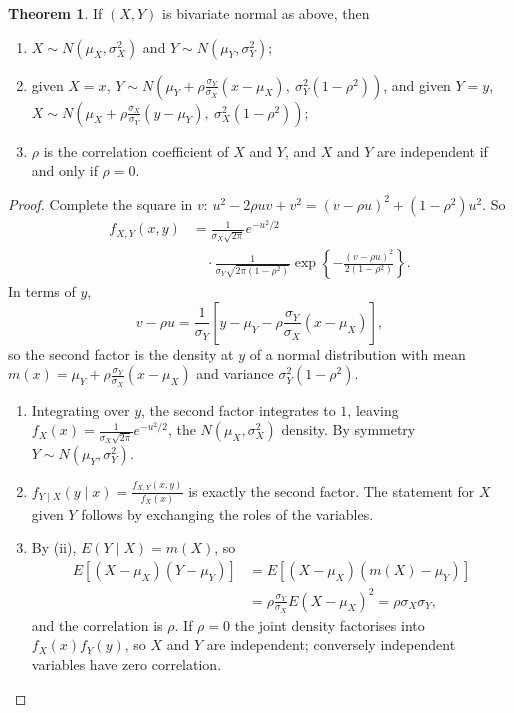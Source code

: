 \documentclass[12pt,a4paper]{report}
\theoremstyle{definition}
\newtheorem{thm}{Theorem}[section]
\theoremstyle{plain}
\theoremstyle{definition}
\begin{document}
\begin{thm}
\label{thm:bivariatenormal}
If $(X, Y)$ is bivariate normal as above, then
\begin{enumerate}
\item[(i)] $X\sim N(\mu_X, \sigma_X^2)$ and $Y\sim N(\mu_Y, \sigma_Y^2)$;
\item[(ii)] given $X = x$, $Y\sim N\left(\mu_Y + \rho\frac{\sigma_Y}{\sigma_X}(x - \mu_X),\ \sigma_Y^2(1 - \rho^2)\right)$, and
given $Y = y$, $X\sim N\left(\mu_X + \rho\frac{\sigma_X}{\sigma_Y}(y - \mu_Y),\ \sigma_X^2(1 - \rho^2)\right)$;
\item[(iii)] $\rho$ is the correlation coefficient of $X$ and $Y$, and $X$ and $Y$ are independent
if and only if $\rho = 0$.
\end{enumerate}
\end{thm}

\begin{proof}
Complete the square in $v$: $u^2 - 2\rho uv + v^2 = (v - \rho u)^2 + (1 - \rho^2)u^2$. So
\begin{align*}
f_{X,Y}(x,y) &= \frac{1}{\sigma_X\sqrt{2\pi}}e^{-u^2/2}\\
&\quad\cdot\frac{1}{\sigma_Y\sqrt{2\pi(1 - \rho^2)}}\exp\left\{-\frac{(v - \rho u)^2}{2(1 - \rho^2)}\right\}.
\end{align*}
In terms of $y$,
\[v - \rho u = \frac{1}{\sigma_Y}\left[y - \mu_Y - \rho\frac{\sigma_Y}{\sigma_X}(x - \mu_X)\right],\]
so the
second factor is the density at $y$ of a normal distribution with mean
$m(x) = \mu_Y + \rho\frac{\sigma_Y}{\sigma_X}(x - \mu_X)$ and variance $\sigma_Y^2(1 - \rho^2)$.
\begin{enumerate}
\item[(i)] Integrating over $y$, the second factor integrates to $1$, leaving
$f_X(x) = \frac{1}{\sigma_X\sqrt{2\pi}}e^{-u^2/2}$, the $N(\mu_X, \sigma_X^2)$ density. By symmetry
$Y\sim N(\mu_Y, \sigma_Y^2)$.
\item[(ii)] $f_{Y\mid X}(y\mid x) = \frac{f_{X,Y}(x,y)}{f_X(x)}$ is exactly the second factor. The
statement for $X$ given $Y$ follows by exchanging the roles of the variables.
\item[(iii)] By (ii), $E(Y\mid X) = m(X)$, so
\begin{align*}
E\left[(X - \mu_X)(Y - \mu_Y)\right] &= E\left[(X - \mu_X)\left(m(X) - \mu_Y\right)\right]\\
&= \rho\frac{\sigma_Y}{\sigma_X}E(X - \mu_X)^2 = \rho\sigma_X\sigma_Y,
\end{align*}
and the correlation is $\rho$. If $\rho = 0$ the joint density factorises into
$f_X(x)f_Y(y)$, so $X$ and $Y$ are independent; conversely independent variables have
zero correlation.
\end{enumerate}
\end{proof}
\end{document}
